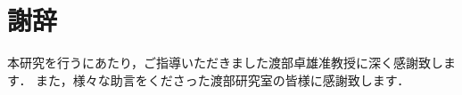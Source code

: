 \documentclass[12pt,dvipdfmx]{jreport}
\begin{document}
\maketitle
\tableofcontents










\chapter*{謝辞}
本研究を行うにあたり，ご指導いただきました渡部卓雄准教授に深く感謝致します．
また，様々な助言をくださった渡部研究室の皆様に感謝致します．




\appendix

\end{document}
